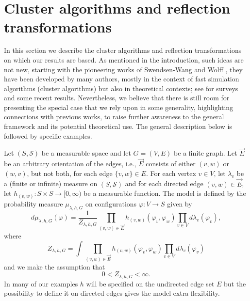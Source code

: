 \documentclass[english]{article}
\renewcommand{\S}{\mathcal{S}}
\theoremstyle{plain}
\theoremstyle{plain}
\begin{document}
\section{Cluster
algorithms and reflection transformations}\label{sec:reflection_transformations_cluster_algorithms}

In this section we describe the cluster algorithms and reflection transformations on which
our results are based. As mentioned in the introduction, such ideas
are not new, starting with the pioneering works of Swendsen-Wang \cite{swendsen1987nonuniversal} and
Wolff \cite{wolff1989collective}, they have been developed by many authors, mostly in the
context of fast simulation algorithms (cluster algorithms) but also
in theoretical contexts; see \cite{kandel1991general, caracciolo1993wolff, sokal1997monte, chayes1997graphical, chayes1998graphical, soprano2015transicion} for surveys and some recent
results. Nevertheless, we
believe that there is still room for presenting the special case
that we rely upon in some generality, highlighting connections with
previous works, to raise further awareness to the general framework
and its potential theoretical use. The general description below is followed by specific examples.

Let $(S,\S)$ be a measurable space and let $G = (V,E)$ be a finite
graph. Let $\vec{E}$ be an arbitrary orientation of the edges, i.e., $\vec{E}$ consists of either $(v,w)$ or $(w,v)$, but not both, for each edge $\{v,w\}\in E$. For each vertex $v\in V$, let $\lambda_v$ be a (finite or
infinite) measure on $(S,\S)$ and for each directed edge $(v,w)\in \vec{E}$, let
$h_{(v,w)}:S\times S\to [0,\infty)$ be a measurable function.
The model is defined by the probability measure $\mu_{\lambda, h,
G}$ on configurations $\varphi:V\to S$ given by
\begin{equation}\label{eq:measure_for_reflections}
  d\mu_{\lambda, h, G}(\varphi) = \frac{1}{Z_{\lambda, h, G}}
  \prod_{(v,w)\in \vec{E}} h_{(v,w)}(\varphi_v, \varphi_w) \prod_{v\in
  V} d\lambda_v(\varphi_v),
\end{equation}
where
\begin{equation*}
  Z_{\lambda, h, G} = \int \prod_{(v,w)\in \vec{E}} h_{(v,w)}(\varphi_v, \varphi_w) \prod_{v\in
  V} d\lambda_v(\varphi_v)
\end{equation*}
and we make the assumption that
\begin{equation}\label{eq:finite_partition_function}
0<Z_{\lambda,h,G}<\infty.
\end{equation}
In many of our examples $h$ will be specified on the undirected edge set $E$ but the possibility to define it on directed edges gives the model extra flexibility.
\end{document}
